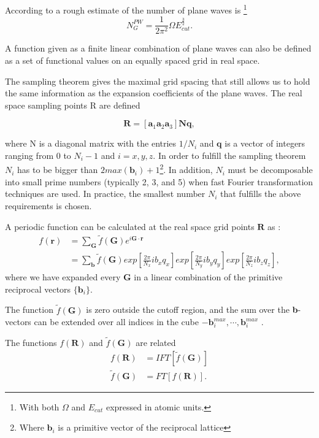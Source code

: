 \documentclass[a4paper,12pt]{article}
\newcommand\mf[1]{\mathbf{#1}}
\newcommand\erre{\mathbf{r}}
\newcommand\GI{\mathbf{G}}
\begin{document}
According to \cite[p.88]{Marx} a rough estimate of the number of plane waves is \footnote{With both $\Omega$ and $E_{cut}$ expressed in atomic units.}
\begin{equation}\label{eq:NGPW}
	N_{G}^{PW} = \frac{1}{2\pi^2}\Omega E_{cut}^{\frac{3}{2}}.
\end{equation}

A function given as a finite linear combination of plane waves can also be defined as a set of functional values on an equally spaced grid in real space.

The sampling theorem gives the maximal grid spacing
that still allows us to hold the same information as the expansion coefficients
of the plane waves. The real space sampling points R are defined

\begin{equation}
	\mf{R} = \left[\mf{a}_1 \mf{a}_2 \mf{a}_3 \right] \mf{N} \mf{q},
\end{equation}

where N is a diagonal matrix with the entries $1/N_i$ and $\mf{q}$ is a vector of
integers ranging from $0$ to $N_i - 1$ and $i = x, y, z$. In order to fulfill the
sampling theorem $N_i$ has to be bigger than $2 max(\mf{b}_i) + 1$\footnote{Where $\mf{b}_i$ is a primitive vector of the reciprocal lattice}. 
In addition, $N_i$ must be decomposable into small prime numbers (typically 2, 3, and 5) when fast Fourier transformation techniques are used.
In practice, the smallest number $N_i$ that fulfills the above requirements is
chosen.

A periodic function can be calculated at the real space grid points $\mf{R}$ as \cite[p.89]{Marx} :
\begin{align}
	f(\erre) &= \sum_{\GI} \tilde{f}(\GI) e^{i \GI \cdot \erre} \\
			 &= \sum_{\mf{b}} \tilde{f}(\GI) exp\left[ \frac{2\pi}{N_{x}} i b_x q_x \right]  exp\left[ \frac{2\pi}{N_{y}} i b_y q_y \right]  exp\left[ \frac{2\pi}{N_{z}} i b_z q_z \right], \label{eq:FFTDef}
\end{align}
where we have expanded every $\GI$ in a linear combination of the primitive reciprocal vectors $\{\mf{b}_i\}$.

The function $\tilde{f}(\GI)$ is zero outside the cutoff region, and the sum over the \textbf{b}-vectors can be extended over all indices in the cube $-\mf{b}_{i}^{max} , \cdots ,\mf{b}_{i}^{max}$ . 

The functions $f(\mf{R})$ and $\tilde{f}(\GI)$ are related
\begin{align}
	f(\mf{R}) &= IFT[ \tilde{f}(\GI) ]\\
	\tilde{f}(\GI) &= FT[ f(\mf{R}) ].
\end{align}
\end{document}
